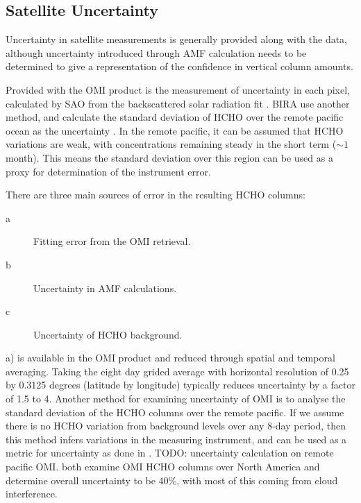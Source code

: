     
    
  \subsection{Satellite Uncertainty}
    \label{BioIsop:Uncertianty:Satellite}
    
    Uncertainty in satellite measurements is generally provided along with the data, although uncertainty introduced through AMF calculation needs to be determined to give a representation of the confidence in vertical column amounts.
    
    Provided with the OMI product is the measurement of uncertainty in each pixel, calculated by SAO from the backscattered solar radiation fit \parencite{Abad2015,Abad2016}.
    BIRA use another method, and calculate the standard deviation of HCHO over the remote pacific ocean as the uncertainty \parencite{DeSmedt2012, DeSmedt2015}.
    In the remote pacific, it can be assumed that HCHO variations are weak, with concentrations remaining steady in the short term ($\sim 1$ month).
    This means the standard deviation over this region can be used as a proxy for determination of the instrument error.
    
    There are three main sources of error in the resulting HCHO columns:
    \begin{description}
      \item[a] Fitting error from the OMI retrieval.
      \item[b] Uncertainty in AMF calculations.
      \item[c] Uncertainty of HCHO background.
    \end{description}
    
    a) is available in the OMI product and reduced through spatial and temporal averaging.
    Taking the eight day grided average with horizontal resolution of 0.25 by 0.3125 degrees (latitude by longitude) typically reduces uncertainty by a factor of 1.5 to 4.
    Another method for examining uncertainty of OMI is to analyse the standard deviation of the HCHO columns over the remote pacific.
    If we assume there is no HCHO variation from background levels over any 8-day period, then this method infers variations in the measuring instrument, and can be used as a metric for uncertainty as done in \textcite{DeSmedt2012}.
    TODO: uncertainty calculation on remote pacific OMI.
    \textcite{Millet2006, Palmer2006} both examine OMI HCHO columns over North America and determine overall uncertainty to be 40\%, with most of this coming from cloud interference.
    
